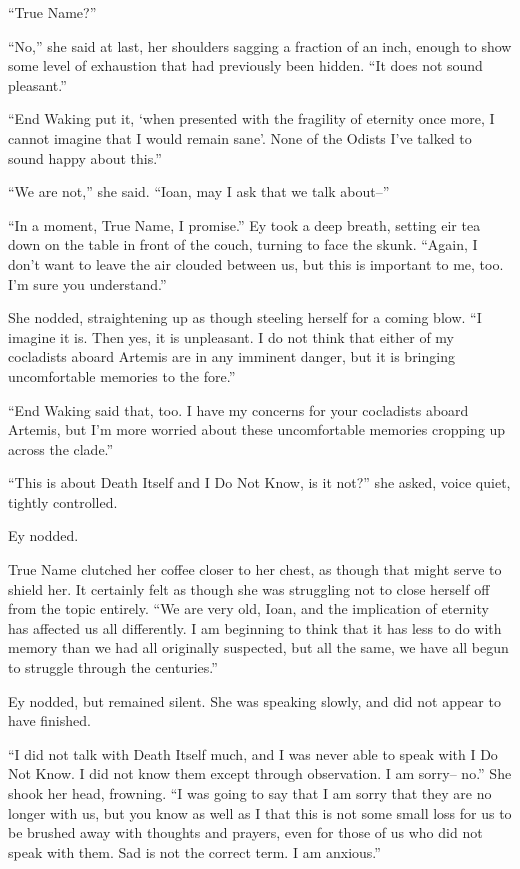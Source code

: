 ``True Name?''

``No,'' she said at last, her shoulders sagging a fraction of an inch, enough to show some level of exhaustion that had previously been hidden. ``It does not sound pleasant.''

``End Waking put it, `when presented with the fragility of eternity once more, I cannot imagine that I would remain sane'. None of the Odists I've talked to sound happy about this.''

``We are not,'' she said. ``Ioan, may I ask that we talk about--''

``In a moment, True Name, I promise.'' Ey took a deep breath, setting eir tea down on the table in front of the couch, turning to face the skunk. ``Again, I don't want to leave the air clouded between us, but this is important to me, too. I'm sure you understand.''

She nodded, straightening up as though steeling herself for a coming blow. ``I imagine it is. Then yes, it is unpleasant. I do not think that either of my cocladists aboard Artemis are in any imminent danger, but it is bringing uncomfortable memories to the fore.''

``End Waking said that, too. I have my concerns for your cocladists aboard Artemis, but I'm more worried about these uncomfortable memories cropping up across the clade.''

``This is about Death Itself and I Do Not Know, is it not?'' she asked, voice quiet, tightly controlled.

Ey nodded.

True Name clutched her coffee closer to her chest, as though that might serve to shield her. It certainly felt as though she was struggling not to close herself off from the topic entirely. ``We are very old, Ioan, and the implication of eternity has affected us all differently. I am beginning to think that it has less to do with memory than we had all originally suspected, but all the same, we have all begun to struggle through the centuries.''

Ey nodded, but remained silent. She was speaking slowly, and did not appear to have finished.

``I did not talk with Death Itself much, and I was never able to speak with I Do Not Know. I did not know them except through observation. I am sorry-- no.'' She shook her head, frowning. ``I was going to say that I am sorry that they are no longer with us, but you know as well as I that this is not some small loss for us to be brushed away with thoughts and prayers, even for those of us who did not speak with them. Sad is not the correct term. I am anxious.''

